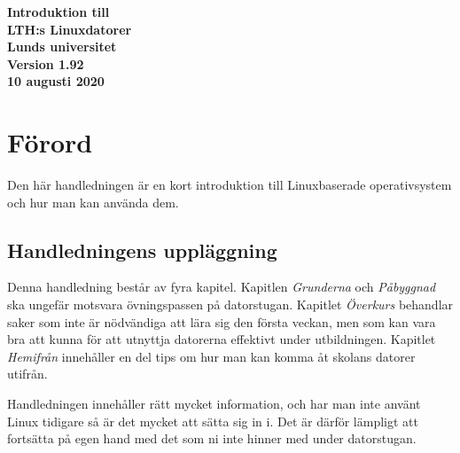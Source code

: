 \documentclass[a4paper,twocolumn]{book}
\begin{document}
\frontmatter

\begin{titlepage}
  \vspace*{30mm}
  \begin{center}
    \sffamily
    \renewcommand{\baselinestretch}{1.1}
    \Huge\bfseries Introduktion till \\[2mm]
      LTH:s Linuxdatorer \\[7mm]
    \large Lunds universitet \\[5mm]
    Version 1.92 \\
    10 augusti 2020
  \end{center}
\end{titlepage}

\onecolumn
\thispagestyle{empty}
\hbox{}\vfill\noindent
\twocolumn

{\parskip 0pt%
  \tableofcontents}             %

\chapter{Förord}
\label{cha:forord}

Den här handledningen är en kort introduktion till Linuxbaserade operativsystem och 
hur man kan använda dem.

\section*{Handledningens uppläggning}

Denna handledning består av fyra kapitel. Kapitlen \emph{Grunderna} och \emph{Påbyggnad} ska ungefär
motsvara övningspassen på datorstugan. Kapitlet \emph{Överkurs}
behandlar saker som inte är nödvändiga att lära sig den första veckan,
men som kan vara bra att kunna för att utnyttja datorerna effektivt under
utbildningen. Kapitlet \emph{Hemifrån} innehåller en del tips om hur man kan
komma åt skolans datorer utifrån.

Handledningen innehåller rätt mycket information, och har man inte använt Linux
 tidigare så är det mycket att sätta sig in i.
Det är därför lämpligt att fortsätta på egen hand med det som ni
inte hinner med under datorstugan.
\end{document}
